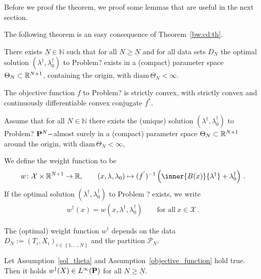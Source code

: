 Before we proof the theorem, we proof some lemmas that are useful in the next section.

The following theorem is an easy consequence of Theorem~\ref{bw:cd:th}.

\begin{assumption}
  \label{sol_theta}
  There exists $\underline{N}\in\mathbb{N}$ such that 
  for all $N\ge \underline{N}$ and for all data sets $D_N$
  the optimal solution
  $(\lambda^\dagger,\lambda_0^\dagger)$
  to Problem? exists in a (compact) parameter space 
  $\Theta_N\subset \R^{N+1}$, containing the origin, with
  $\mathrm{diam}\,\Theta_N<\infty$.
\end{assumption}

\begin{assumption}
  \label{objective_function}
  The objective function $f$ to Problem? is strictly convex, with strictly convex and continuously differentiable convex conjugate $f^*$. 
\end{assumption}
  Assume that for all $N\in\mathbb{N}$ there exists the (unique) solution 
  $(\lambda^\dagger,\lambda_0^\dagger)$
  to Problem?
  $\P^N-$almost surely in a (compact) parameter space
  $\Theta_N\subset\R^{N+1}$ around the origin, with $\mathrm{diam}\,  \Theta_N<\infty$, 
\begin{definition}
  We define the weight function to be
\begin{gather*}
  w
  \colon
  \mathcal{X}
  \times
  \R^{N+1}
  \to
  \R
  ,\qquad
  \left( 
  x
  ,
  \lambda
  ,
  \lambda_0
  \right)
  \mapsto
    (
    f^{'}
    )^{-1}
    \left( 
      \inner{B(x)}{\lambda^\dagger}
      +
      \lambda_0^\dagger
    \right)
    \,.
\end{gather*}
If 
  the optimal solution
  $(\lambda^\dagger,\lambda_0^\dagger)$
  to Problem ? exists, we write
  \begin{gather*}
    w^\dagger(x)
    =
    w(x,\lambda^\dagger,\lambda^\dagger_0)
    \qquad
    \text{for all}\ 
    x\in\mathcal{X}\,.
  \end{gather*}
\end{definition}
\begin{remark}
  The (optimal) weight function $w^\dagger$ depends on the data
  $D_N:=
  (T_i,X_i)_{i\in \left\{ 1,\ldots,N \right\}}$
  and the partition $\mathcal{P}_N$.
\end{remark}
\begin{lemma}
  \label{weights_bounded}
  Let Assumption~\ref{sol_theta} and Assumption~\ref{objective_function} hold true.
  Then it holds 
  $
  w^\dagger(X)\in L^\infty(\P)
  $ for all $N\ge \underline{N}$.
\end{lemma}
